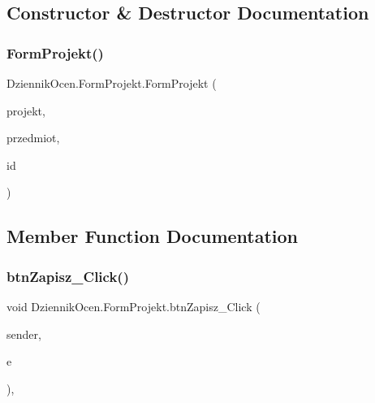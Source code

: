 \subsection{Constructor \& Destructor Documentation}
\mbox{\label{class_dziennik_ocen_1_1_form_projekt_a8be8499fb861f2375950c4e61e7dcc8a}} 
\subsubsection{\texorpdfstring{Form\+Projekt()}{FormProjekt()}}
{\footnotesize\ttfamily Dziennik\+Ocen.\+Form\+Projekt.\+Form\+Projekt (\begin{DoxyParamCaption}\item[{\hyperlink{class_dziennik_ocen_1_1_p_r_o_j_e_k_t}{P\+R\+O\+J\+E\+KT}}]{projekt,  }\item[{I\+List$<$ \hyperlink{class_dziennik_ocen_1_1_p_r_z_e_d_m_i_o_t}{P\+R\+Z\+E\+D\+M\+I\+OT} $>$}]{przedmiot,  }\item[{int}]{id }\end{DoxyParamCaption})\hspace{0.3cm}{\ttfamily [inline]}}



\subsection{Member Function Documentation}
\mbox{\label{class_dziennik_ocen_1_1_form_projekt_af5c591d1f084dde2ea7389a669882a57}} 
\subsubsection{\texorpdfstring{btn\+Zapisz\+\_\+\+Click()}{btnZapisz\_Click()}}
{\footnotesize\ttfamily void Dziennik\+Ocen.\+Form\+Projekt.\+btn\+Zapisz\+\_\+\+Click (\begin{DoxyParamCaption}\item[{object}]{sender,  }\item[{Event\+Args}]{e }\end{DoxyParamCaption})\hspace{0.3cm}{\ttfamily [inline]}, {\ttfamily [private]}}

